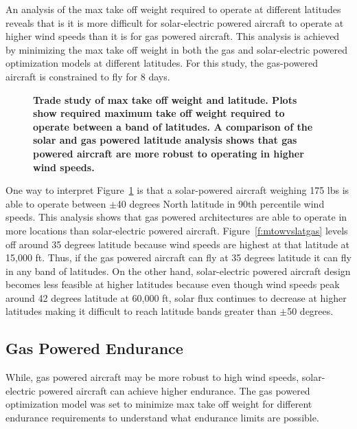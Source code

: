 \documentclass[]{aiaa-tc}%
\begin{document}
An analysis of the max take off weight required to operate at different latitudes reveals that is it is more difficult for solar-electric powered aircraft to operate at higher wind speeds than it is for gas powered aircraft.
This analysis is achieved by minimizing the max take off weight in both the gas and solar-electric powered optimization models at different latitudes. 
For this study, the gas-powered aircraft is constrained to fly for 8 days. 

\begin{figure}[H]
 \begin{subfigmatrix}{2}%
 \end{subfigmatrix}
 \caption{\textbf{ Trade study of max take off weight and latitude. Plots show required maximum take off weight required to operate between a band of latitudes.   A comparison of the solar and gas powered latitude analysis shows that gas powered aircraft are more robust to operating in higher wind speeds. }}
 \label{f:latvsmtowtrade}
\end{figure}

One way to interpret Figure~\ref{f:latvsmtowtrade} is that a solar-powered aircraft weighing 175 lbs is able to operate between $\pm$40 degrees North latitude in 90th percentile wind speeds.  
This analysis shows that gas powered architectures are able to operate in more locations than solar-electric powered aircraft.  
Figure~\ref{f:mtowvslatgas} levels off around 35 degrees latitude because wind speeds are highest at that latitude at 15,000 ft. 
Thus, if the gas powered aircraft can fly at 35 degrees latitude it can fly in any band of latitudes.  
On the other hand, solar-electric powered aircraft design becomes less feasible at higher latitudes because even though wind speeds peak around 42 degrees latitude at 60,000 ft, solar flux continues to decrease at higher latitudes making it difficult to reach latitude bands greater than $\pm$50 degrees. 

\subsection{Gas Powered Endurance}

While, gas powered aircraft may be more robust to high wind speeds, solar-electric powered aircraft can achieve higher endurance. 
The gas powered optimization model was set to minimize max take off weight for different endurance requirements to understand what endurance limits are possible. 
\end{document}
